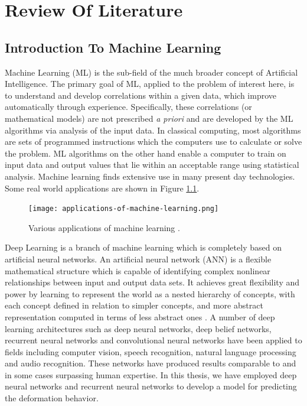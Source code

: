 \chapter{Review Of Literature} %

\label{Chapter2} %

\label{sec:2}
\section{Introduction To Machine Learning}
Machine Learning (ML) is the sub-field of the much broader concept of Artificial Intelligence. The primary goal of ML, applied to the problem of interest here, is to understand and develop correlations within a given data, which improve automatically through experience. Specifically, these correlations (or mathematical models) are not prescribed \textit{a priori} and are developed by the ML algorithms via analysis of the input data. In classical computing, most algorithms are sets of programmed instructions which the computers use to calculate or solve the problem. ML algorithms on the other hand enable a computer to train on input data and output values that lie within an acceptable range using statistical analysis. Machine learning finds extensive use in many present day technologies. Some real world applications are shown in Figure \ref{fig:app-ml}. 

\begin{figure}[!h]
	\centering
	\texttt{[image: applications-of-machine-learning.png]}
	\hspace{1mm}
	\caption{Various applications of machine learning \cite{mlimage}.} 
	\label{fig:app-ml}
\end{figure}

Deep Learning is a branch of machine learning which is completely based on artificial neural networks. An artificial neural network (ANN) is a flexible mathematical structure which is capable of identifying complex nonlinear relationships between input and output data sets.  It achieves great flexibility and power by learning to represent the world as a nested hierarchy of concepts, with each concept defined in relation to simpler concepts, and more abstract representation computed in terms of less abstract ones \cite{dlintro}. A number of deep learning architectures such as deep neural networks, deep belief networks, recurrent neural networks and convolutional neural networks have been applied to fields including computer vision, speech recognition, natural language processing and audio recognition. These networks have produced results comparable to and in some cases surpassing human expertise. In this thesis, we have employed deep neural networks and recurrent neural networks to develop a model for predicting the deformation behavior.

